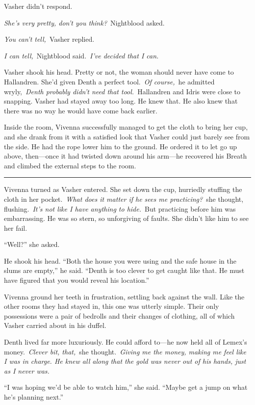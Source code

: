 Vasher didn’t respond.

\textit{She’s very pretty, don’t you think?}~Nightblood asked.

\textit{You can’t tell,}~Vasher replied.

\textit{I can tell,}~Nightblood said.~\textit{I’ve decided that I can.}

Vasher shook his head. Pretty or not, the woman should never have come to Hallandren. She’d given Denth a perfect tool.~\textit{Of course,}~he admitted wryly,~\textit{Denth probably didn’t need that tool.}~Hallandren and Idris were close to snapping. Vasher had stayed away too long. He knew that. He also knew that there was no way he would have come back earlier.

Inside the room, Vivenna successfully managed to get the cloth to bring her cup, and she drank from it with a satisfied look that Vasher could just barely see from the side. He had the rope lower him to the ground. He ordered it to let go up above, then—once it had twisted down around his arm—he recovered his Breath and climbed the external steps to the room.

\bigskip \hrule \bigskip

Vivenna turned as Vasher entered. She set down the cup, hurriedly stuffing the cloth in her pocket.~\textit{What does it matter if he sees me practicing?}~she thought, flushing.~\textit{It’s not like I have anything to hide.}~But practicing before him was embarrassing. He was so stern, so unforgiving of faults. She didn’t like him to see her fail.

“Well?” she asked.

He shook his head. “Both the house you were using and the safe house in the slums are empty,” he said. “Denth is too clever to get caught like that. He must have figured that you would reveal his location.”

Vivenna ground her teeth in frustration, settling back against the wall. Like the other rooms they had stayed in, this one was utterly simple. Their only possessions were a pair of bedrolls and their changes of clothing, all of which Vasher carried about in his duffel.

Denth lived far more luxuriously. He could afford to—he now held all of Lemex’s money.~\textit{Clever bit, that,}~she thought.~\textit{Giving me the money, making me feel like I was in charge. He knew all along that the gold was never out of his hands, just as I never was.}

“I was hoping we’d be able to watch him,” she said. “Maybe get a jump on what he’s planning next.”

